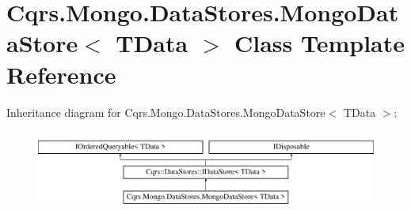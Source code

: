 \hypertarget{classCqrs_1_1Mongo_1_1DataStores_1_1MongoDataStore}{}\section{Cqrs.\+Mongo.\+Data\+Stores.\+Mongo\+Data\+Store$<$ T\+Data $>$ Class Template Reference}
\label{classCqrs_1_1Mongo_1_1DataStores_1_1MongoDataStore}
Inheritance diagram for Cqrs.\+Mongo.\+Data\+Stores.\+Mongo\+Data\+Store$<$ T\+Data $>$\+:\begin{figure}[H]
\begin{center}
\leavevmode
\includegraphics[height=2.700965cm]{classCqrs_1_1Mongo_1_1DataStores_1_1MongoDataStore}
\end{center}
\end{figure}
